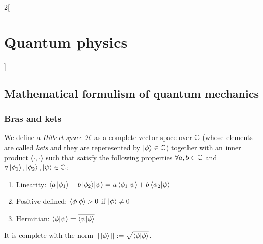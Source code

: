 \documentclass[../../../main.tex]{subfiles}
\begin{document}
\begin{multicols}{2}[\section{Quantum physics}]
  \subsection{Mathematical formulism of quantum mechanics}
  \subsubsection{Bras and kets}
  \begin{definition}
    We define a \emph{Hilbert space} $\mathcal{H}$ as a complete vector space over $\mathbb{C}$ (whose elements are called \emph{kets} and they are reperesented by $\ket{\phi}\in\mathbb{C}$) together with an inner product $\langle\cdot,\cdot\rangle$ such that satisfy the following properties $\forall a,b\in\mathbb{C}$ and $\forall \ket{\phi_1},\ket{\phi_2},\ket\psi\in \mathbb{C}$:
    \begin{enumerate}
      \item Linearity: $\braket{a\ket{\phi_1}+b\ket{\phi_2}}{\psi}=a\braket{\phi_1}{\psi}+b\braket{\phi_2}{\psi}$
      \item Positive defined: $\braket{\phi}{\phi}>0$ if $\ket{\phi}\ne 0$
      \item Hermitian: $\braket{\phi}{\psi}=\overline{\braket{\psi}{\phi}}$
    \end{enumerate}
    It is complete with the norm $\|\ket{\phi}\|:=\sqrt{\braket{\phi}{\phi}}$.
  \end{definition}
\end{multicols}
\end{document}
